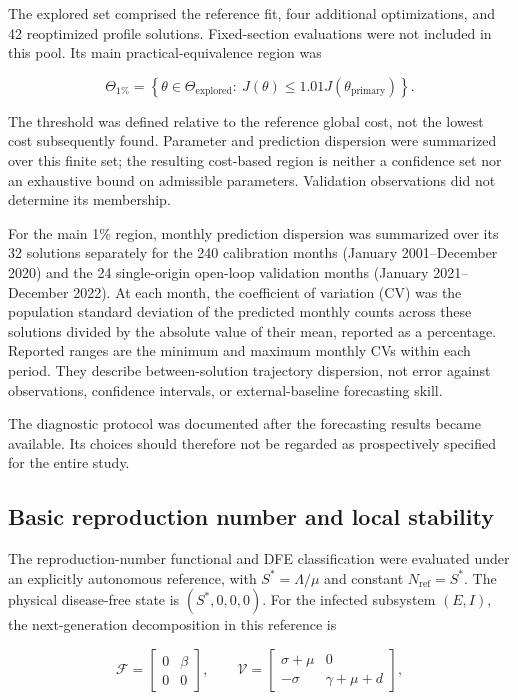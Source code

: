 \documentclass[pdflatex,sn-mathphys-ay]{sn-jnl}
\begin{document}
The explored set comprised the reference fit, four additional optimizations, and 42 reoptimized profile solutions. Fixed-section evaluations were not included in this pool. Its main practical-equivalence region was

\[
\Theta_{1\%}=\left\{\theta\in\Theta_{\mathrm{explored}}:\ J(\theta)\le1.01J(\theta_{\mathrm{primary}})\right\}.
\]

The threshold was defined relative to the reference global cost, not the lowest cost subsequently found. Parameter and prediction dispersion were summarized over this finite set; the resulting cost-based region is neither a confidence set nor an exhaustive bound on admissible parameters. Validation observations did not determine its membership.

For the main 1\% region, monthly prediction dispersion was summarized over its 32 solutions separately for the 240 calibration months (January 2001--December 2020) and the 24 single-origin open-loop validation months (January 2021--December 2022). At each month, the coefficient of variation (CV) was the population standard deviation of the predicted monthly counts across these solutions divided by the absolute value of their mean, reported as a percentage. Reported ranges are the minimum and maximum monthly CVs within each period. They describe between-solution trajectory dispersion, not error against observations, confidence intervals, or external-baseline forecasting skill.

The diagnostic protocol was documented after the forecasting results became available. Its choices should therefore not be regarded as prospectively specified for the entire study.

\subsection{Basic reproduction number and local stability}

The reproduction-number functional and DFE classification were evaluated under an explicitly autonomous reference, with $S^*=\Lambda/\mu$ and constant $N_{\mathrm{ref}}=S^*$. The physical disease-free state is $(S^*,0,0,0)$. For the infected subsystem $(E,I)$, the next-generation decomposition in this reference is

\[
\mathcal F=\begin{bmatrix}0&\beta\\0&0\end{bmatrix},\qquad
\mathcal V=\begin{bmatrix}\sigma+\mu&0\\-\sigma&\gamma+\mu+d\end{bmatrix},
\]
\end{document}
